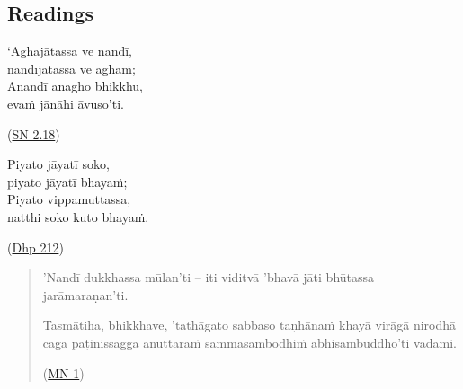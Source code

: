 \documentclass[11pt,oneside]{memoir}
\begin{document}
\normalArrayStrech

\clearpage

\subsection{Readings}
\label{sec:org6b1cb39}

\begin{twocols}
`Aghajātassa ve nandī, \\[0pt]
nandījātassa ve aghaṁ; \\[0pt]
Anandī anagho bhikkhu, \\[0pt]
evaṁ jānāhi āvuso'ti.

(\href{https://suttacentral.net/sn2.18/pli/ms}{SN 2.18})

\columnbreak

Piyato jāyatī soko, \\[0pt]
piyato jāyatī bhayaṁ; \\[0pt]
Piyato vippamuttassa, \\[0pt]
natthi soko kuto bhayaṁ.

(\href{https://suttacentral.net/dhp209-220/pli/ms}{Dhp 212})
\end{twocols}

\begin{quote}
\raggedright

'Nandī dukkhassa mūlan'ti -- iti viditvā 'bhavā jāti bhūtassa jarāmaraṇan'ti.

Tasmātiha, bhikkhave, 'tathāgato sabbaso taṇhānaṁ khayā virāgā nirodhā cāgā paṭinissaggā anuttaraṁ sammāsambodhiṁ abhisambuddho'ti vadāmi.

(\href{https://suttacentral.net/mn1/pli/ms}{MN 1})
\end{quote}

\bigskip
\end{document}

